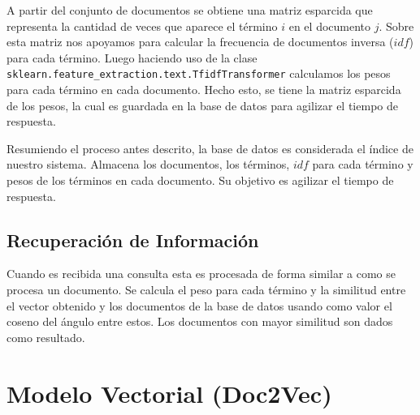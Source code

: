 \documentclass[12pt]{llncs}
\begin{document}
A partir del conjunto de documentos se obtiene una matriz esparcida que representa la cantidad de veces que aparece el término $i$ en el documento $j$. Sobre esta matriz nos apoyamos para calcular la frecuencia de documentos inversa ($idf$) para cada término. Luego haciendo uso de la clase \verb+sklearn.feature_extraction.text.TfidfTransformer+ calculamos los pesos para cada término en cada documento. Hecho esto, se tiene la matriz esparcida de los pesos, la cual es guardada en la base de datos para agilizar el tiempo de respuesta.

Resumiendo el proceso antes descrito, la base de datos es considerada el índice de nuestro sistema. Almacena los documentos, los términos, $idf$ para cada término y pesos de los términos en cada documento. Su objetivo es agilizar el tiempo de respuesta.

\subsection{Recuperación de Información}

Cuando es recibida una consulta esta es procesada de forma similar a como se procesa un documento. Se calcula el peso para cada término y la similitud entre el vector obtenido y los documentos de la base de datos usando como valor el coseno del ángulo entre estos. Los documentos con mayor similitud son dados como resultado.


\section{Modelo Vectorial (Doc2Vec)}
\end{document}
